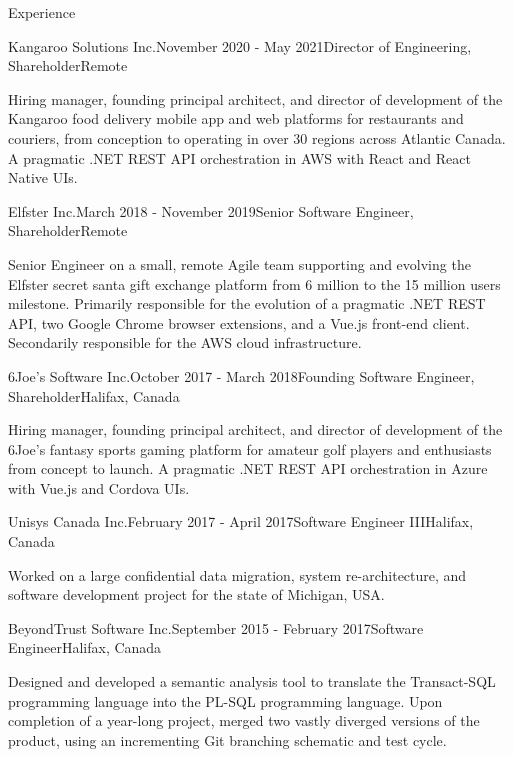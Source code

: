 \documentclass{resume} %
\begin{document}
\begin{rSection}{Experience}
		\begin{rSubsection}{Kangaroo Solutions Inc.}{November 2020 - May 2021}{Director of Engineering, Shareholder}{Remote}
			\item[] Hiring manager, founding principal architect, and director of development of the Kangaroo food delivery mobile app and web platforms for restaurants and couriers, from conception to operating in over 30 regions across Atlantic Canada. A pragmatic .NET REST API orchestration in AWS with React and React Native UIs.
		\end{rSubsection}
		
		\begin{rSubsection}{Elfster Inc.}{March 2018 - November 2019}{Senior Software Engineer, Shareholder}{Remote}
			\item[] Senior Engineer on a small, remote Agile team supporting and evolving the Elfster secret santa gift exchange platform from 6 million to the 15 million users milestone. Primarily responsible for the evolution of a pragmatic .NET REST API, two Google Chrome browser extensions, and a Vue.js front-end client. Secondarily responsible for the AWS cloud infrastructure.
		\end{rSubsection}
		
		\pagebreak
		
		\begin{rSubsection}{6Joe's Software Inc.}{October 2017 - March 2018}{Founding Software Engineer, Shareholder}{Halifax, Canada}
			\item[] Hiring manager, founding principal architect, and director of development of the 6Joe's fantasy sports gaming platform for amateur golf players and enthusiasts from concept to launch. A pragmatic .NET REST API orchestration in Azure with Vue.js and Cordova UIs.
		\end{rSubsection}
		
		\begin{rSubsection}{Unisys Canada Inc.}{February 2017 - April 2017}{Software Engineer III}{Halifax, Canada}
			\item[] Worked on a large confidential data migration, system re-architecture, and software development project for the state of Michigan, USA.
		\end{rSubsection}
		
		\begin{rSubsection}{BeyondTrust Software Inc.}{September 2015 - February 2017}{Software Engineer}{Halifax, Canada}
			\item[] Designed and developed a semantic analysis tool to translate the Transact-SQL programming language into the PL-SQL programming language. Upon completion of a year-long project, merged two vastly diverged versions of the product, using an incrementing Git branching schematic and test cycle.
		\end{rSubsection}
		

\end{rSection}
\end{document}
